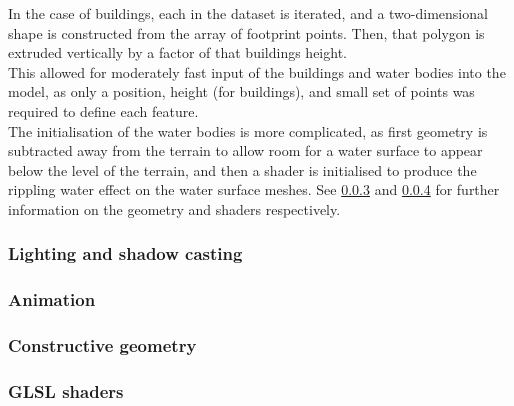             In the case of buildings, each in the dataset is iterated, and a two-dimensional shape is constructed from the array of footprint points.
            Then, that polygon is extruded vertically by a factor of that buildings height.\\

            This allowed for moderately fast input of the buildings and water bodies into the model, as only a position, height (for buildings), and small set of points was required to define each feature.\\

            The initialisation of the water bodies is more complicated, as first geometry is subtracted away from the terrain to allow room for a water surface to appear below the level of the terrain, and then a shader is initialised to produce the rippling water effect on the water surface meshes. See \ref{ssub:constructive_geometry} and \ref{ssub:glsl_shaders} for further information on the geometry and shaders respectively.


        \subsubsection{Lighting and shadow casting} %
        \label{ssub:lighting_and_shadow_casting}
            

        \subsubsection{Animation} %
        \label{ssub:animation}
            

        \subsubsection{Constructive geometry} %
        \label{ssub:constructive_geometry}
            

        \subsubsection{GLSL shaders} %
        \label{ssub:glsl_shaders}
            



